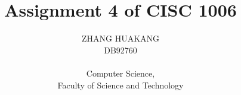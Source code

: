 \documentclass{article}
\title{Assignment 4 of CISC 1006}
\author{ZHANG HUAKANG \\ DB92760 \\ \\ Computer Science, \\Faculty of Science and Technology}
\begin{document}
    \maketitle
    \section{}
\end{document}
